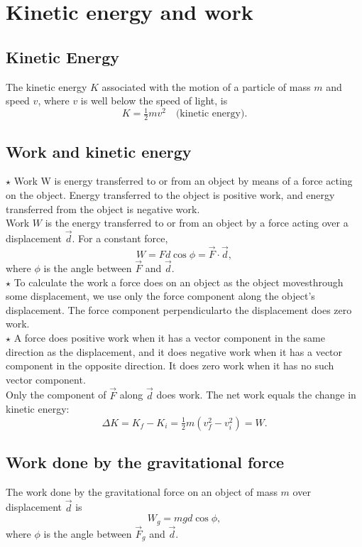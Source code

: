 \section{Kinetic energy and work}
\subsection{Kinetic Energy}
The kinetic energy $K$ associated with the motion of a particle of mass $m$ and speed $v$, where $v$ is well below the speed of light, is
\[
K = \tfrac{1}{2}mv^2 \quad \text{(kinetic energy).}
\]

\subsection{Work and kinetic energy}

$\star$ Work W is energy transferred to or from an object by means of a force acting on
the object. Energy transferred to the object is positive work, and energy transferred from the object is negative work.\\
Work $W$ is the energy transferred to or from an object by a force acting over a displacement $\vec{d}$. For a constant force,
\[
W = Fd\cos\phi = \vec{F} \cdot \vec{d},
\]
where $\phi$ is the angle between $\vec{F}$ and $\vec{d}$.
\\
$\star$ To calculate the work a force does on an object as the object movesthrough some
displacement, we use only the force component along the object’s displacement.
The force component perpendicularto the displacement does zero work.\\
$\star$ A force does positive work when it has a vector component in the same direction
as the displacement, and it does negative work when it has a vector component in
the opposite direction. It does zero work when it has no such vector component.\\

Only the component of $\vec{F}$ along $\vec{d}$ does work. The net work equals the change in kinetic energy:
\[
\Delta K = K_f - K_i = \tfrac{1}{2} m (v_f^2 - v_i^2) = W.
\]

\subsection{Work done by the gravitational force}

The work done by the gravitational force on an object of mass $m$ over displacement $\vec{d}$ is
\[
W_g = mgd \cos \phi,
\]
where $\phi$ is the angle between $\vec{F}_g$ and $\vec{d}$.

